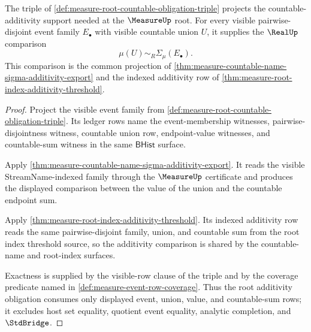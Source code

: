 \begin{theorem}
\label{thm:measure-root-countable-additivity-obligation}
The triple of \autoref{def:measure-root-countable-obligation-triple}
projects the countable-additivity support needed at the $\MeasureUp$ root.
For every visible pairwise-disjoint event family $E_\bullet$ with visible
countable union $U$, it supplies the $\RealUp$ comparison
$$
\mu(U)\sim_R\Sigma_\mu(E_\bullet).
$$
This comparison is the common projection of
\autoref{thm:measure-countable-name-sigma-additivity-export} and the indexed
additivity row of \autoref{thm:measure-root-index-additivity-threshold}.
\end{theorem}
\begin{proof}
Project the visible event family from
\autoref{def:measure-root-countable-obligation-triple}. Its ledger rows name
the event-membership witnesses, pairwise-disjointness witness, countable
union row, endpoint-value witnesses, and countable-sum witness in the same
$\mathsf{BHist}$ surface.

Apply \autoref{thm:measure-countable-name-sigma-additivity-export}. It reads
the visible StreamName-indexed family through the $\MeasureUp$ certificate and
produces the displayed comparison between the value of the union and the
countable endpoint sum.

Apply \autoref{thm:measure-root-index-additivity-threshold}. Its indexed
additivity row reads the same pairwise-disjoint family, union, and countable
sum from the root index threshold source, so the additivity comparison is
shared by the countable-name and root-index surfaces.

Exactness is supplied by the visible-row clause of the triple and by the
coverage predicate named in \autoref{def:measure-event-row-coverage}. Thus
the root additivity obligation consumes only displayed event, union, value,
and countable-sum rows; it excludes host set equality, quotient event
equality, analytic completion, and $\StdBridge$.
\end{proof}

